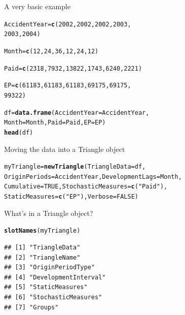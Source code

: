 \documentclass[xcolor=dvipsnames]{beamer}\usepackage{graphicx, color}
\makeatletter
\newcommand{\hlfunctioncall}[1]{\textcolor[rgb]{0.501960784313725,0,0.329411764705882}{\textbf{#1}}}%
\newcommand{\hlstring}[1]{\textcolor[rgb]{0.6,0.6,1}{#1}}%
\newenvironment{kframe}{%
 \def\at@end@of@kframe{}%
 \ifinner\ifhmode%
  \def\at@end@of@kframe{\end{minipage}}%
  \begin{minipage}{\columnwidth}%
 \fi\fi%
 \def\FrameCommand##1{\hskip\@totalleftmargin \hskip-\fboxsep
 \colorbox{shadecolor}{##1}\hskip-\fboxsep
     \hskip-\linewidth \hskip-\@totalleftmargin \hskip\columnwidth}%
 \MakeFramed {\advance\hsize-\width
   \@totalleftmargin\z@ \linewidth\hsize
   \@setminipage}}%
 {\par\unskip\endMakeFramed%
 \at@end@of@kframe}
\newenvironment{knitrout}{}{} %
\makeatother
\begin{document}
\begin{frame}[fragile]{A very basic example}
\begin{knitrout}
\color{fgcolor}\begin{kframe}
\begin{alltt}
AccidentYear = \hlfunctioncall{c}(2002, 2002, 2002, 2003, 
    2003, 2004)

Month = \hlfunctioncall{c}(12, 24, 36, 12, 24, 12)

Paid = \hlfunctioncall{c}(2318, 7932, 13822, 1743, 6240, 2221)

EP = \hlfunctioncall{c}(61183, 61183, 61183, 69175, 69175, 
    99322)

df = \hlfunctioncall{data.frame}(AccidentYear = AccidentYear, 
    Month = Month, Paid = Paid, EP = EP)
\hlfunctioncall{head}(df)
\end{alltt}
\end{kframe}
\end{knitrout}

\end{frame}

\begin{frame}[fragile] {Moving the data into a Triangle object}
\begin{knitrout}
\color{fgcolor}\begin{kframe}
\begin{alltt}
myTriangle = \hlfunctioncall{newTriangle}(TriangleData = df, 
    OriginPeriods = AccidentYear, DevelopmentLags = Month, 
    Cumulative = TRUE, StochasticMeasures = \hlfunctioncall{c}(\hlstring{"Paid"}), 
    StaticMeasures = \hlfunctioncall{c}(\hlstring{"EP"}), Verbose = FALSE)
\end{alltt}
\end{kframe}
\end{knitrout}

\end{frame}

\begin{frame}[fragile]{What's in a Triangle object?}
\begin{knitrout}
\color{fgcolor}\begin{kframe}
\begin{alltt}
\hlfunctioncall{slotNames}(myTriangle)
\end{alltt}
\begin{verbatim}
## [1] "TriangleData"       
## [2] "TriangleName"       
## [3] "OriginPeriodType"   
## [4] "DevelopmentInterval"
## [5] "StaticMeasures"     
## [6] "StochasticMeasures" 
## [7] "Groups"
\end{verbatim}
\end{kframe}
\end{knitrout}

\end{frame}
\end{document}
